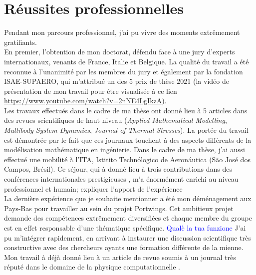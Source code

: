 \documentclass[12pt, french]{article}
\begin{document}
	
	\section{Réussites professionnelles}
	
	Pendant mon parcours professionnel, j'ai pu vivre des moments extrêmement gratifiants. \\
	
	En premier, l'obtention de mon doctorat, défendu face à une jury d'experts internationaux, venants de France, Italie et Belgique. La qualité du travail a été reconnue à l'unanimité par les membres du jury et également par la fondation ISAE-SUPAERO, qui m'attribué un des 5 prix de thèse 2021 (la vidéo de présentation de mon travail pour être visualisée à ce lien \url{https://www.youtube.com/watch?v=2nNE4LgIkzA}). \\
	
	Les travaux effectués dans le cadre de ma thèse ont donné lieu à 5 articles dans des revues scientifiques de haut niveau  (\textit{Applied Mathematical Modelling}, \textit{Multibody System Dynamics}, \textit{Journal of Thermal Stresses}). La portée du travail est démontrée par le fait que ces journaux touchent à des aspects différents de la modélisation mathématique en ingénierie. Dans le cadre de ma thèse, j'ai aussi effectué une  mobilité à l'ITA, Istitito Techn\'ologico de Aeron\'autica (São José dos Campos, Brésil). Ce séjour, qui à donné lieu à trois contributions dans des conférences internationales prestigieuses , m'a énormément enrichi au niveau professionnel et humain; expliquer l'apport de l'expérience \\
	
	La dernière expérience que je souhaite mentionner a été mon déménagement aux Pays-Bas pour travailler au sein du projet Portwings. Cet ambitieux projet demande des compétences extrêmement diversifiées et chaque membre du groupe est en effet responsable d'une thématique spécifique. \textcolor{blue}{Qualè la tua funzione} J'ai pu m'intégrer rapidement, en arrivant à instaurer une discussion scientifique très constructive avec des chercheurs ayants une formation différente de la mienne. Mon travail à déjà donné lieu à un article de revue soumis à un journal très réputé dans le domaine de la physique computationnelle . 
	
	
	
	
	
\end{document}
